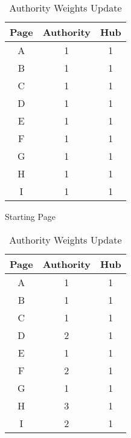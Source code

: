 \documentclass[12pt,english]{article}
\begin{document}
\begin{table}[!htb]
    \begin{minipage}{.5\linewidth}
      \centering
        \begin{tabular}{|c|c|c|}
			\hline
			Page & Authority & Hub \\
			\hline
			A & 1 & 1 \\ 
			B & 1 & 1 \\
			C & 1 & 1 \\ 
			D & 1 & 1 \\
			E & 1 & 1 \\ 
			F & 1 & 1 \\
			G & 1 & 1 \\ 
			H & 1 & 1 \\
			I & 1 & 1 \\
			\hline
        \end{tabular}
      \caption{Starting Page}
    \end{minipage}%
    \begin{minipage}{.5\linewidth}
      \centering
        \begin{tabular}{|c|c|c|}
			\hline
			Page & Authority & Hub \\
			\hline
			A & 1 & 1 \\ 
			B & 1 & 1 \\
			C & 1 & 1 \\ 
			D & 2 & 1 \\
			E & 1 & 1 \\ 
			F & 2 & 1 \\
			G & 1 & 1 \\ 
			H & 3 & 1 \\
			I & 2 & 1 \\
			\hline
        \end{tabular}
        \caption{Authority Weights Update}
    \end{minipage} 
\end{table}
\end{document}
